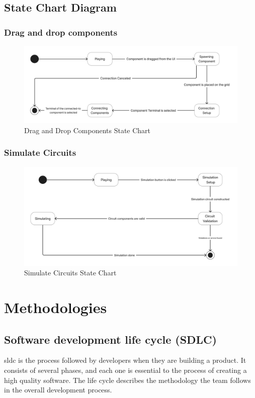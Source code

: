 \documentclass[../main.tex]{subfiles}
\begin{document}
\subsection{State Chart Diagram}
\subsubsection{Drag and drop components}

\begin{figure}[h!]
\centering
\includegraphics[scale=0.1]{images/chapter3/stateChart1.png}
\caption{Drag and Drop Components State Chart}
\label{Drag And Drop Components State Chart}
\end{figure}

\subsubsection{Simulate Circuits}
\begin{figure}[h!]
\centering
\includegraphics[scale=0.1]{images/chapter3/StateChart2.png}
\caption{Simulate Circuits State Chart}
\label{Simulate Circuits State Chart}
\end{figure}
\vfill
\newpage
\section{Methodologies}
\subsection{Software development life cycle (SDLC)}
\acrfull{sldc} is the process followed by developers when they are building a product. It consists of several phases, and each one is essential to the process of creating a high quality software. The life cycle describes the methodology the team follows in the overall development process. 
\end{document}
